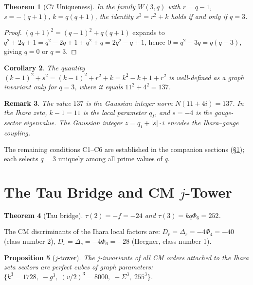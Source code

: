 \documentclass[12pt]{article}
\newtheorem{theorem}{Theorem}[section]
\newtheorem{corollary}[theorem]{Corollary}
\newtheorem{proposition}[theorem]{Proposition}
\newtheorem{remark}[theorem]{Remark}
\begin{document}
\begin{theorem}[C7 Uniqueness]\label{thm:C7}
In the family $W(3,q)$ with $r = q-1$, $s = -(q+1)$, $k = q(q+1)$,
the identity $s^2 = r^2 + k$ holds if and only if $q = 3$.
\end{theorem}
\begin{proof}
$(q+1)^2 = (q-1)^2 + q(q+1)$ expands to
$q^2 + 2q + 1 = q^2 - 2q + 1 + q^2 + q = 2q^2 - q + 1$,
hence $0 = q^2 - 3q = q(q-3)$, giving $q = 0$ or $q = 3$.
\end{proof}

\begin{corollary}\label{cor:alpha}
The quantity $(k-1)^2 + s^2 = (k-1)^2 + r^2 + k = k^2 - k + 1 + r^2$
is well-defined as a graph invariant only for $q = 3$, where it equals
$11^2 + 4^2 = 137$.
\end{corollary}

\begin{remark}
The value $137$ is the Gaussian integer norm $N(11 + 4i) = 137$.
In the Ihara zeta, $k-1 = 11$ is the local parameter $q_I$, and
$s = -4$ is the gauge-sector eigenvalue. The Gaussian integer
$z = q_I + |s| \cdot i$ encodes the Ihara--gauge coupling.
\end{remark}

The remaining conditions C1--C6 are established in the companion
sections (\S\ref{sec:tau}); each selects $q=3$ uniquely among all
prime values of $q$.

\section{The Tau Bridge and CM $j$-Tower}
\label{sec:tau}

\begin{theorem}[Tau bridge]
$\tau(2) = -f = -24$ and $\tau(3) = kq\Phi_6 = 252$.
\end{theorem}

The CM discriminants of the Ihara local factors are:
$D_r = \Delta_r = -4\Phi_4 = -40$ (class number 2),
$D_s = \Delta_s = -4\Phi_6 = -28$ (Heegner, class number 1).

\begin{proposition}[$j$-tower]\label{prop:cube}
The $j$-invariants of all CM orders attached to the Ihara zeta sectors
are perfect cubes of graph parameters:
$\{k^3 = 1728,\; -g^3,\; (v/2)^3 = 8000,\; -\Sigma^3,\; 255^3\}$.
\end{proposition}

\end{document}
